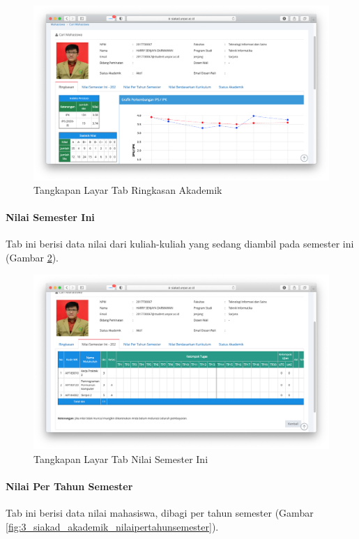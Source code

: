 \begin{figure}[H]
    \centering
    \includegraphics[scale=0.3]{Gambar/siakad_akademik_ringkasan.png}
    \caption{Tangkapan Layar Tab Ringkasan Akademik}
    \label{fig:3_siakad_akademik_ringkasan}
\end{figure}

\paragraph{Nilai Semester Ini} Tab ini berisi data nilai dari kuliah-kuliah yang sedang diambil pada semester ini (Gambar \ref{fig:3_siakad_akademik_nilaisemesterini}).

\begin{figure}[H]
    \centering
    \includegraphics[scale=0.35]{Gambar/siakad_akademik_nilaisemesterini.png}
    \caption{Tangkapan Layar Tab Nilai Semester Ini}
    \label{fig:3_siakad_akademik_nilaisemesterini}
\end{figure}

\paragraph{Nilai Per Tahun Semester} Tab ini berisi data nilai mahasiswa, dibagi per tahun semester (Gambar \ref{fig:3_siakad_akademik_nilaipertahunsemester}).

